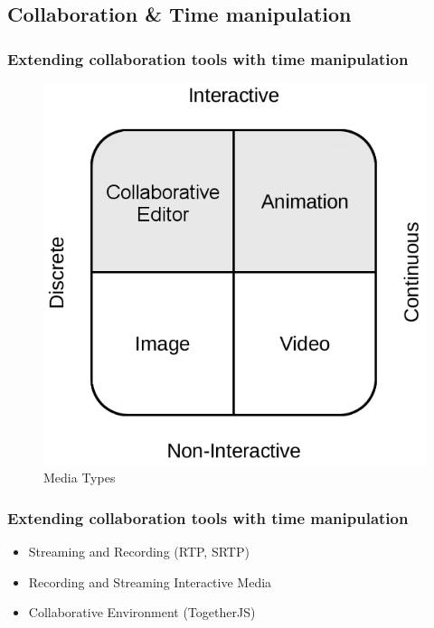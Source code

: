 \documentclass[compress]{beamer}
\begin{document}
	\subsection{Collaboration \& Time manipulation}
  		\begin{frame}[c]
		\frametitle{Extending collaboration tools with time manipulation}
		
		\begin{figure}
			\includegraphics[height=0.5\textheight]{figures/media_types.png}
			\caption{Media Types}
		\end{figure}
		\end{frame}



  		\begin{frame}[c]
		\frametitle{Extending collaboration tools with time manipulation}
		\begin{itemize}
		\item Streaming and Recording (RTP, SRTP)
		\vfill
		\item Recording and Streaming Interactive Media
		\vfill
		\item Collaborative Environment (TogetherJS)
		\end{itemize}
		\end{frame}
\end{document}
